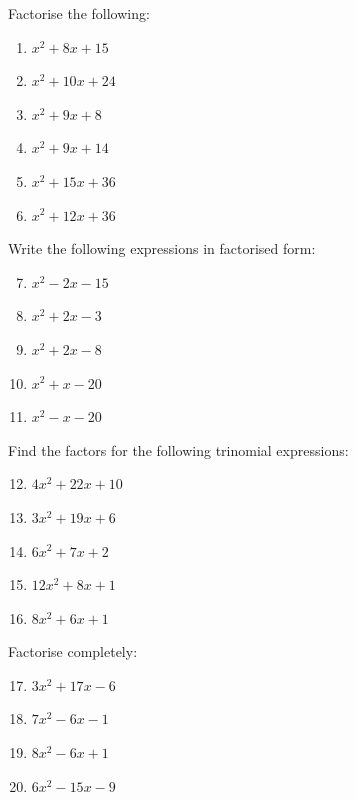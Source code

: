     
    \noindent
\label{m39394*secfhsst!!!underscore!!!id2756}
\begin{exercises}{}
 {
Factorise the following:
\begin{multicols}{2}
\begin{enumerate}[itemsep=5pt, label=\textbf{\arabic*}. ] 
\item ${x}^{2}+8x+15$
\item ${x}^{2}+10x+24$
\item ${x}^{2}+9x+8$
\item ${x}^{2}+9x+14$
\item ${x}^{2}+15x+36$
\item ${x}^{2}+12x+36$
\end{enumerate}
\end{multicols}


Write the following expressions in factorised form:
\begin{multicols}{2}
\begin{enumerate}[itemsep=5pt, label=\textbf{\arabic*}. ] 
\setcounter{enumi}{6}
\item ${x}^{2}-2x-15$
\item ${x}^{2}+2x-3$
\item ${x}^{2}+2x-8$
\item ${x}^{2}+x-20$
\item ${x}^{2}-x-20$
\end{enumerate}
\end{multicols}


Find the factors for the following trinomial expressions:
\begin{multicols}{2}
\begin{enumerate}[itemsep=5pt, label=\textbf{\arabic*}. ] 
\setcounter{enumi}{11}
\item $4{x}^{2}+22x+10$
\item $3{x}^{2}+19x+6$
\item $6{x}^{2}+7x+2$
\item $12{x}^{2}+8x+1$
\item $8{x}^{2}+6x+1$
\end{enumerate}
\end{multicols}

Factorise completely:
\begin{multicols}{2}
\begin{enumerate}[itemsep=5pt, label=\textbf{\arabic*}. ] 
\setcounter{enumi}{16}
\item $3{x}^{2}+17x-6$
\item $7{x}^{2}-6x-1$
\item $8{x}^{2}-6x+1$
\item $6{x}^{2}-15x-9$
\end{enumerate}
\end{multicols}


}
\end{exercises}

